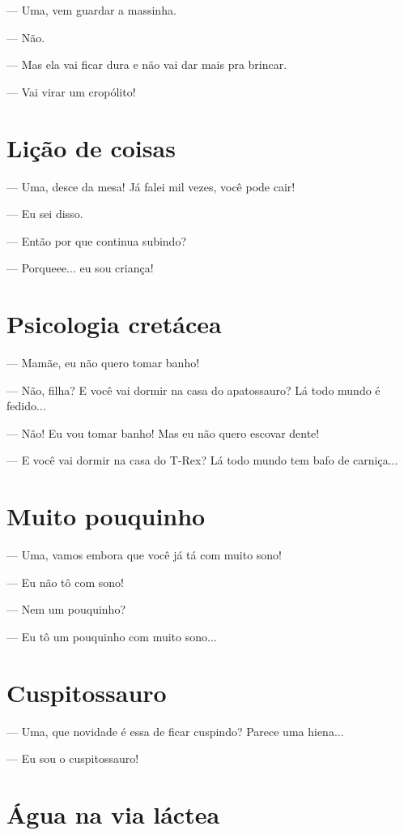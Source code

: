 {— Uma, vem guardar a massinha.

— Não.

— Mas ela vai ficar dura e não vai dar mais pra brincar.

— Vai virar um cropólito!

\chapter{Lição de coisas}

— Uma, desce da mesa! Já falei mil vezes, você pode cair!

— Eu sei disso.

— Então por que continua subindo?

— Porqueee... eu sou criança!

\chapter{Psicologia cretácea}

— Mamãe, eu não quero tomar banho!

— Não, filha? E você vai dormir na casa do apatossauro? Lá todo mundo é
fedido...

— Não! Eu vou tomar banho! Mas eu não quero escovar dente!

— E você vai dormir na casa do T-Rex? Lá todo mundo tem bafo de
carniça...

\chapter{Muito pouquinho}

— Uma, vamos embora que você já tá com muito sono!

— Eu não tô com sono!

— Nem um pouquinho?

— Eu tô um pouquinho com muito sono...

\chapter{Cuspitossauro}

— Uma, que novidade é essa de ficar cuspindo? Parece uma hiena...

— Eu sou o cuspitossauro!

\chapter{Água na via láctea}

}
